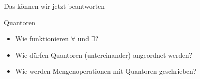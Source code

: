 \begin{frame}[fragile]{Das können wir jetzt beantworten}
    \begin{alertblock}{Quantoren}
        \begin{itemize}
            \item Wie funktionieren $\forall$ und $\exists$?
            \item Wie dürfen Quantoren (untereinander) angeordnet werden?
            \item Wie werden Mengenoperationen mit Quantoren geschrieben?
        \end{itemize}
    \end{alertblock}
\end{frame}